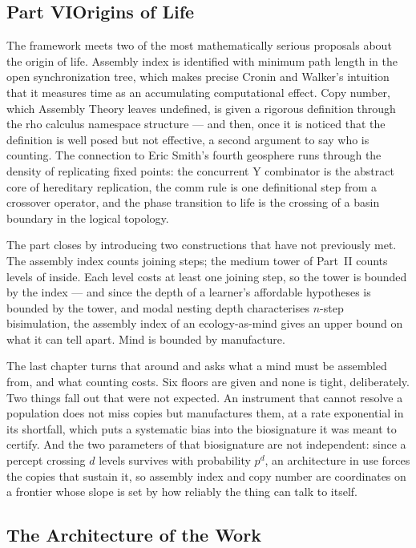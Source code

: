 \documentclass[12pt,openright,twoside]{book}
\theoremstyle{remark}
\theoremstyle{plain}
\theoremstyle{remark}
\theoremstyle{plain}
\theoremstyle{plain}
\begin{document}
\subsection*{Part VI\quad Origins of Life}

The framework meets two of the most mathematically serious proposals
about the origin of life.
Assembly index is identified with minimum path length in the open
synchronization tree, which makes precise Cronin and Walker's intuition
that it measures time as an accumulating computational effect.
Copy number, which Assembly Theory leaves undefined, is given a rigorous
definition through the rho calculus namespace structure --- and then, once
it is noticed that the definition is well posed but not effective, a
second argument to say who is counting.
The connection to Eric Smith's fourth geosphere runs through the density
of replicating fixed points: the concurrent Y combinator is the abstract
core of hereditary replication, the comm rule is one definitional step
from a crossover operator, and the phase transition to life is the
crossing of a basin boundary in the logical topology.

The part closes by introducing two constructions that have not previously
met.
The assembly index counts joining steps; the medium tower of Part~II
counts levels of inside.
Each level costs at least one joining step, so the tower is bounded by
the index --- and since the depth of a learner's affordable hypotheses is
bounded by the tower, and modal nesting depth characterises $n$-step
bisimulation, the assembly index of an ecology-as-mind gives an upper
bound on what it can tell apart.
Mind is bounded by manufacture.

The last chapter turns that around and asks what a mind must be
assembled from, and what counting costs.
Six floors are given and none is tight, deliberately.
Two things fall out that were not expected.
An instrument that cannot resolve a population does not miss copies but
manufactures them, at a rate exponential in its shortfall, which puts a
systematic bias into the biosignature it was meant to certify.
And the two parameters of that biosignature are not independent: since a
percept crossing $d$ levels survives with probability $p^{d}$, an
architecture in use forces the copies that sustain it, so assembly index
and copy number are coordinates on a frontier whose slope is set by how
reliably the thing can talk to itself.

\bigskip

\subsection*{The Architecture of the Work}
\end{document}
